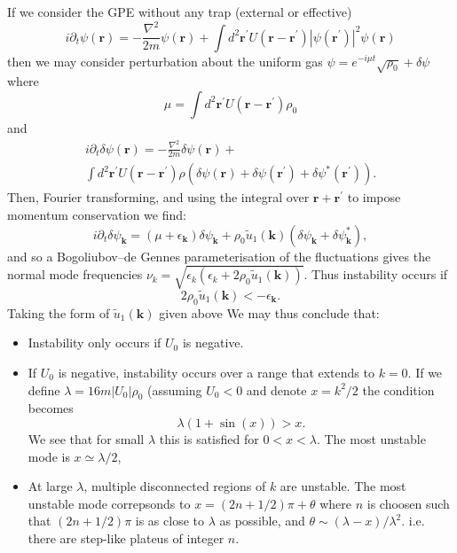 \documentclass[twocolumn]{revtex4-1}
\renewcommand{\vec}[1]{\mathbf{#1}}
\begin{document}
If we consider the GPE without any trap (external or effective)
\begin{displaymath}
  i \partial_t \psi(\vec{r})
  = - \frac{\nabla^2}{2m} \psi(\vec{r})
  + \int d^2\vec{r}^\prime U(\vec{r}-\vec{r}^\prime) |\psi(\vec{r}^\prime)|^2 
  \psi(\vec{r})
\end{displaymath}
then we may consider perturbation about the uniform
gas $\psi = e^{-i \mu t} \sqrt{\rho_0} + \delta \psi$ where
\begin{displaymath}
  \mu = \int d^2\vec{r}^\prime U(\vec{r}-\vec{r}^\prime) \rho_0
\end{displaymath}
and
\begin{multline}
  i \partial_t \delta \psi(\vec{r})
  = - \frac{\nabla^2}{2m} \delta\psi(\vec{r})
  + \\\int d^2\vec{r}^\prime U(\vec{r}-\vec{r}^\prime) \rho
  \left(
     \delta \psi(\vec{r})
    +
    \delta \psi(\vec{r}^\prime)
    +
    \delta \psi^\ast(\vec{r}^\prime)
  \right).
\end{multline}
Then, Fourier transforming, and using the integral over
$\vec{r}+\vec{r}^\prime$ to impose momentum conservation we find:
\begin{displaymath}
  i \partial_t \delta \psi_{\vec{k}}
  = (\mu + \epsilon_{\vec{k}}) \delta \psi_{\vec{k}}
  + \rho_0\tilde{u}_1(\vec{k}) ( \delta \psi_{\vec{k}} +\delta \psi^\ast_{\vec{k}}),
\end{displaymath}
and so a Bogoliubov--de Gennes parameterisation of the fluctuations
gives the normal mode frequencies $\nu_k =\sqrt{\epsilon_k(\epsilon_k
+2 \rho_0\tilde{u}_1(\vec{k}))}$.  Thus instability
occurs if
\begin{displaymath}
  2 \rho_0\tilde{u}_1(\vec{k}) < - \epsilon_{\vec{k}}.
\end{displaymath}
Taking the form of $\tilde{u}_1(\vec{k})$ given above
We may thus conclude that:
\begin{itemize}
\item Instability only occurs if $U_0$ is negative.
\item If $U_0$ is negative, instability occurs over a range that
  extends to $k=0$.  If we define $\lambda = 16 m |U_0| \rho_0$
  (assuming $U_0<0$ and denote $x=k^2/2$ the condition becomes
  \begin{displaymath}
    \lambda (1+ \sin(x)) > x.
  \end{displaymath}
  We see that for small $\lambda$ this is satisfied for
  $0<x<\lambda$.  The most unstable
  mode is $x \simeq \lambda/2$, 
\item At large $\lambda$, multiple disconnected regions of $k$
  are unstable.  The most unstable mode correpsonds
  to $x = (2n+1/2)\pi + \theta$ where $n$ is choosen
  such that $(2n+1/2)\pi$ is as close to $\lambda$ as
  possible, and $\theta \sim (\lambda-x)/\lambda^2$.  i.e. there
  are step-like plateus of integer $n$.
\end{itemize}
\end{document}

